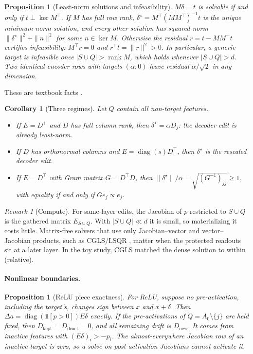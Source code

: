 \documentclass{article}
\theoremstyle{plain}
\newtheorem{proposition}[theorem]{Proposition}
\newtheorem{corollary}[theorem]{Corollary}
\theoremstyle{definition}
\theoremstyle{remark}
\newtheorem{remark}[theorem]{Remark}
\begin{document}
\begin{proposition}[Least-norm solutions and infeasibility]
\label{prop:feasible}
$M\delta = t$ is solvable if and only if $t\perp\ker M^{\top}$. If $M$ has full row rank,
$\delta^\star = M^{\top}(MM^{\top})^{-1}t$ is the unique minimum-norm solution, and every
other solution has squared norm $\|\delta^\star\|^2 + \|n\|^2$ for some $n\in\ker M$.
Otherwise the residual $r = t - MM^{+}t$ certifies infeasibility: $M^{\top}r = 0$ and
$r^{\top}t = \|r\|^2 > 0$. In particular, a generic target is infeasible once
$|S\cup Q| > \operatorname{rank}M$, which holds whenever $|S\cup Q| > d$. Two identical
encoder rows with targets $(\alpha,0)$ leave residual $\alpha/\sqrt2$ in any dimension.
\end{proposition}
These are textbook facts \citep{golub2013matrix,bjorck1996numerical}.

\begin{corollary}[Three regimes]
\label{cor:regimes}
Let $Q$ contain all non-target features.
\begin{itemize}
  \item If $E = D^{+}$ and $D$ has full column rank, then $\delta^\star = \alpha D_j$: the
  decoder edit is already least-norm.
  \item If $D$ has orthonormal columns and $E = \operatorname{diag}(s)D^{\top}$, then
  $\delta^\star$ is the rescaled decoder edit.
  \item If $E = D^{\top}$ with Gram matrix $G = D^{\top}D$, then
  $\|\delta^\star\|/\alpha = \sqrt{(G^{-1})_{jj}}\ge 1$, with equality if and only if
  $Ge_j\propto e_j$.
\end{itemize}
\end{corollary}

\begin{remark}[Compute]
For same-layer edits, the Jacobian of $p$ restricted to $S\cup Q$ is the gathered matrix
$E_{S\cup Q}$. With $|S\cup Q|\ll d$ it is small, so materializing it costs little.
Matrix-free solvers that use only Jacobian--vector and vector--Jacobian products, such as
CGLS/LSQR \citep{paige1982lsqr,bjorck1996numerical}, matter when the protected readouts sit at
a later layer. In the toy study, CGLS matched the dense solution to within \VfiveMaxDiff{}
(relative).
\end{remark}

\paragraph{Nonlinear boundaries.}
\begin{proposition}[ReLU piece exactness]
\label{prop:relu}
For ReLU, suppose no pre-activation, including the target's, changes sign between $x$ and
$x+\delta$. Then $\Delta a = \operatorname{diag}(\mathbb{1}[p>0])E\delta$ exactly. If the
pre-activations of $Q = A_0\setminus\{j\}$ are held fixed, then
$D_{\mathrm{kept}} = D_{\mathrm{deact}} = 0$, and all remaining drift is $D_{\mathrm{new}}$. It
comes from inactive features with $(E\delta)_i > -p_i$. The almost-everywhere Jacobian row
of an inactive target is zero, so a solve on post-activation Jacobians cannot activate it.
\end{proposition}
\end{document}
